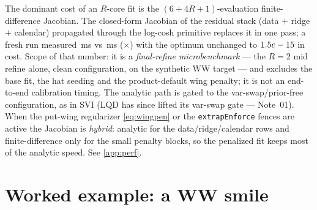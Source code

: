 \documentclass[11pt]{article}
\begin{document}
\begin{perfbox}
The dominant cost of an $R$-core fit is the $(6+4R+1)$-evaluation
finite-difference Jacobian. The closed-form Jacobian of the residual stack (data
$+$ ridge $+$ calendar) propagated through the log-cosh primitive replaces it in
one pass; a fresh run measured \sivanalyticms\,ms vs \sivfdms\,ms
(\sivspeedup$\times$) with the optimum unchanged to $1.5e-15$ in cost.
Scope of that number: it is a \emph{final-refine microbenchmark} --- the $R=2$
mid refine alone, clean configuration, on the synthetic WW target --- and
excludes the base fit, the hat seeding and the product-default wing penalty;
it is not an end-to-end calibration timing. The analytic path is gated to the
var-swap/prior-free configuration, as in SVI (LQD has since lifted its
var-swap gate --- Note~01). When the put-wing
regularizer \eqref{eq:wingpen} or the \texttt{extrapEnforce} fences are active
the Jacobian is \emph{hybrid}: analytic for the data/ridge/calendar rows and
finite-difference only for the small penalty blocks, so the penalized fit
keeps most of the analytic speed. See \cref{app:perf}.
\end{perfbox}

\section{Worked example: a WW smile}
\label{sec:example}
\end{document}
